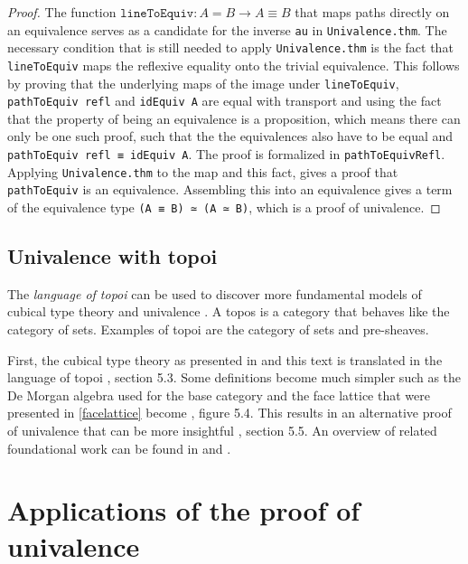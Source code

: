\documentclass[12pt,a4paper,twoside,xetex]{book} %
\newcommand{\keyword}[1]{\emph{#1}\index{#1}}
\newcommand{\op}[1]{\mathtt{#1}}
\begin{document}
\begin{proof}
The function $\op{lineToEquiv} : A = B \rightarrow A \equiv B$ that maps paths 
directly on an equivalence serves as a candidate for the inverse \texttt{au} in 
\texttt{Univalence.thm}. The necessary condition that is still needed to apply 
\texttt{Univalence.thm} is the fact that \texttt{lineToEquiv} maps the 
reflexive equality onto the trivial equivalence. This follows by proving that 
the underlying maps of the image under \texttt{lineToEquiv}, 
\texttt{pathToEquiv refl} and \texttt{idEquiv A} are equal with transport and 
using the fact that the property of being an equivalence is a proposition, 
which means there can only be one such proof, such that the the equivalences 
also have to be equal and \texttt{pathToEquiv refl ≡ idEquiv A}. The proof is 
formalized in \texttt{pathToEquivRefl}. Applying \texttt{Univalence.thm} to the 
map and this fact, gives a proof that \texttt{pathToEquiv} is an equivalence. 
Assembling this into an equivalence gives a term of the equivalence type 
\texttt{(A ≡ B) ≃ (A ≃ B)}, which is a proof of univalence.
\end{proof}

\subsection{Univalence with topoi}

The \keyword{language of topoi} can be used to discover more fundamental 
models of cubical type theory and univalence \cite{Orton2019}. A topos is a 
category that behaves like the category of sets. Examples of topoi are the 
category of sets and pre-sheaves. 

First, the cubical type theory as presented in \cite{Huber2016} and this text 
is translated in the  language of topoi \cite{Orton2019}, section 5.3. Some 
definitions become much simpler such as the De Morgan algebra used for the base 
category and the face lattice that were presented in \cref{facelattice} become 
\cite{Orton2019}, figure 5.4. This results in an alternative proof of 
univalence that can be more insightful \cite{Orton2019}, section 5.5. An 
overview of related foundational work can be found in \cite{Pitts2018} and 
\cite{Licata2018}.


\section{Applications of the proof of univalence} \label{applications}
\end{document}
